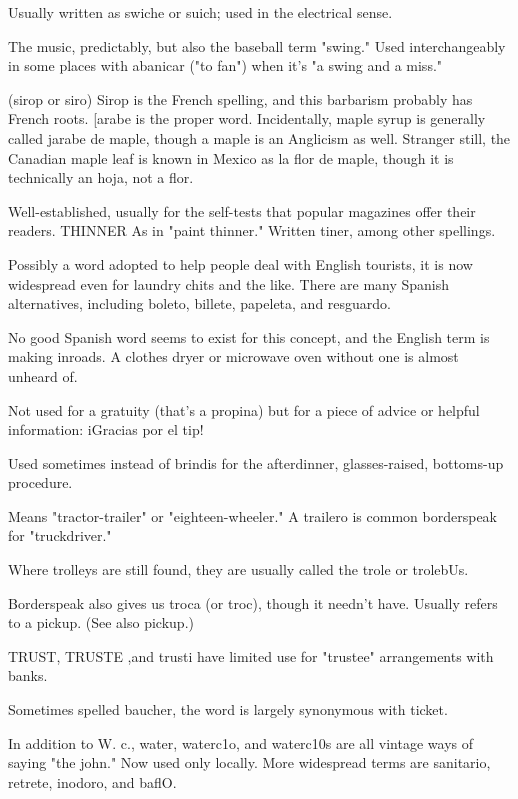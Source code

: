  Usually written as swiche or suich; used in the electrical sense.

 The music, predictably, but also the baseball term
"swing." Used interchangeably in some places with abanicar ("to fan")
when it's "a swing and a miss."

 (sirop or siro) Sirop is the French spelling, and this
barbarism probably has French roots. [arabe is the proper word. Incidentally, maple syrup is generally called jarabe de maple, though a
maple is an Anglicism as well. Stranger still, the Canadian maple leaf
is known in Mexico as la flor de maple, though it is technically an
hoja, not a flor.

 Well-established, usually for the self-tests that popular
magazines offer their readers.
THINNER As in "paint thinner." Written tiner, among other
spellings.

 Possibly a word adopted to help people deal with English tourists, it is now widespread even for laundry chits and the like.
There are many Spanish alternatives, including boleto, billete, papeleta, and resguardo.

 No good Spanish word seems to exist for this concept,
and the English term is making inroads. A clothes dryer or microwave
oven without one is almost unheard of.

 Not used for a gratuity (that's a propina) but for a piece of
advice or helpful information: iGracias por el tip!

 Used sometimes instead of brindis for the afterdinner, glasses-raised, bottoms-up procedure.

 Means "tractor-trailer" or "eighteen-wheeler." A
trailero is common borderspeak for "truckdriver."

 Where trolleys are still found, they are usually
called the trole or trolebUs.

 Borderspeak also gives us troca (or troc), though it
needn't have. Usually refers to a pickup. (See also pickup.)

 TRUST, TRUSTE ,and trusti have limited use for
"trustee" arrangements with banks.

 Sometimes spelled baucher, the word is largely
synonymous with ticket.

 In addition to W. c., water, waterc1o, and waterc10s are
all vintage ways of saying "the john." Now used only locally. More
widespread terms are sanitario, retrete, inodoro, and baflO.

